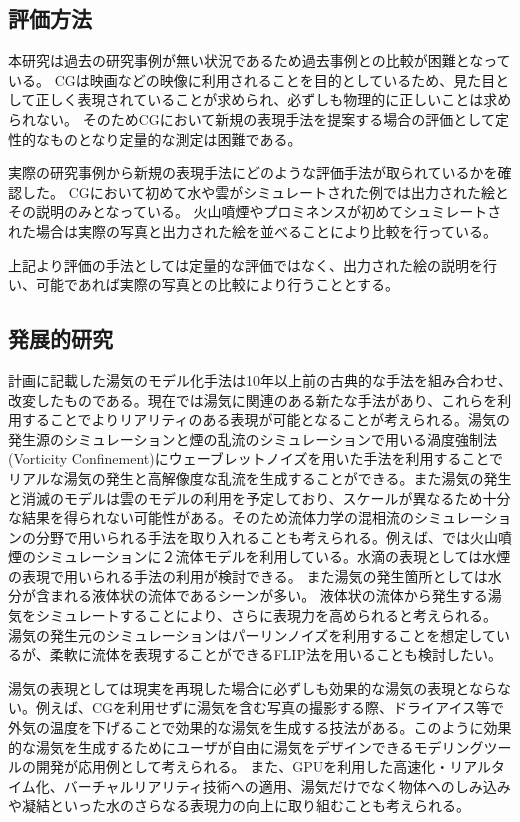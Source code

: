 \subsection{評価方法}
本研究は過去の研究事例が無い状況であるため過去事例との比較が困難となっている。
CGは映画などの映像に利用されることを目的としているため、見た目として正しく表現されていることが求められ、必ずしも物理的に正しいことは求められない。
そのためCGにおいて新規の表現手法を提案する場合の評価として定性的なものとなり定量的な測定は困難である。

実際の研究事例から新規の表現手法にどのような評価手法が取られているかを確認した。
CGにおいて初めて水\cite{Foster1996}や雲\cite{Gardner1985}がシミュレートされた例では出力された絵とその説明のみとなっている。
火山噴煙\cite{Mizuno2003}やプロミネンス\cite{Ishikawa}が初めてシュミレートされた場合は実際の写真と出力された絵を並べることにより比較を行っている。

上記より評価の手法としては定量的な評価ではなく、出力された絵の説明を行い、可能であれば実際の写真との比較により行うこととする。

\subsection{発展的研究}
計画に記載した湯気のモデル化手法は10年以上前の古典的な手法を組み合わせ、改変したものである。現在では湯気に関連のある新たな手法があり、これらを利用することでよりリアリティのある表現が可能となることが考えられる。湯気の発生源のシミュレーションと煙の乱流のシミュレーションで用いる渦度強制法(Vorticity Confinement)にウェーブレットノイズを用いた手法\cite{Kim2008}を利用することでリアルな湯気の発生と高解像度な乱流を生成することができる。また湯気の発生と消滅のモデルは雲のモデルの利用を予定しており、スケールが異なるため十分な結果を得られない可能性がある。そのため流体力学の混相流のシミュレーションの分野で用いられる手法を取り入れることも考えられる。例えば、\cite{Mizuno2003}では火山噴煙のシミュレーションに２流体モデルを利用している。水滴の表現としては水煙の表現で用いられる手法\cite{Nielsen2013}の利用が検討できる。
また湯気の発生箇所としては水分が含まれる液体状の流体であるシーンが多い。
液体状の流体から発生する湯気をシミュレートすることにより、さらに表現力を高められると考えられる。
湯気の発生元のシミュレーションはパーリンノイズを利用することを想定しているが、柔軟に流体を表現することができるFLIP法\cite{Zhu2005}を用いることも検討したい。

湯気の表現としては現実を再現した場合に必ずしも効果的な湯気の表現とならない。例えば、CGを利用せずに湯気を含む写真の撮影する際、ドライアイス等で外気の温度を下げることで効果的な湯気を生成する技法がある。このように効果的な湯気を生成するためにユーザが自由に湯気をデザインできるモデリングツールの開発が応用例として考えられる。
また、GPUを利用した高速化・リアルタイム化、バーチャルリアリティ技術への適用、湯気だけでなく物体へのしみ込みや凝結といった水のさらなる表現力の向上に取り組むことも考えられる。

